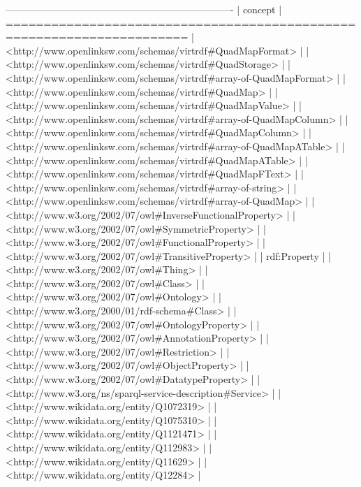 \documentclass[a4paper, 12pt]{report}
\begin{document}
\begin{messageshell}
----------------------------------------------------------------------
| concept                                                            |
======================================================================
| <http://www.openlinksw.com/schemas/virtrdf#QuadMapFormat>          |
| <http://www.openlinksw.com/schemas/virtrdf#QuadStorage>            |
| <http://www.openlinksw.com/schemas/virtrdf#array-of-QuadMapFormat> |
| <http://www.openlinksw.com/schemas/virtrdf#QuadMap>                |
| <http://www.openlinksw.com/schemas/virtrdf#QuadMapValue>           |
| <http://www.openlinksw.com/schemas/virtrdf#array-of-QuadMapColumn> |
| <http://www.openlinksw.com/schemas/virtrdf#QuadMapColumn>          |
| <http://www.openlinksw.com/schemas/virtrdf#array-of-QuadMapATable> |
| <http://www.openlinksw.com/schemas/virtrdf#QuadMapATable>          |
| <http://www.openlinksw.com/schemas/virtrdf#QuadMapFText>           |
| <http://www.openlinksw.com/schemas/virtrdf#array-of-string>        |
| <http://www.openlinksw.com/schemas/virtrdf#array-of-QuadMap>       |
| <http://www.w3.org/2002/07/owl#InverseFunctionalProperty>          |
| <http://www.w3.org/2002/07/owl#SymmetricProperty>                  |
| <http://www.w3.org/2002/07/owl#FunctionalProperty>                 |
| <http://www.w3.org/2002/07/owl#TransitiveProperty>                 |
| rdf:Property                                                       |
| <http://www.w3.org/2002/07/owl#Thing>                              |
| <http://www.w3.org/2002/07/owl#Class>                              |
| <http://www.w3.org/2002/07/owl#Ontology>                           |
| <http://www.w3.org/2000/01/rdf-schema#Class>                       |
| <http://www.w3.org/2002/07/owl#OntologyProperty>                   |
| <http://www.w3.org/2002/07/owl#AnnotationProperty>                 |
| <http://www.w3.org/2002/07/owl#Restriction>                        |
| <http://www.w3.org/2002/07/owl#ObjectProperty>                     |
| <http://www.w3.org/2002/07/owl#DatatypeProperty>                   |
| <http://www.w3.org/ns/sparql-service-description#Service>          |
| <http://www.wikidata.org/entity/Q1072319>                          |
| <http://www.wikidata.org/entity/Q1075310>                          |
| <http://www.wikidata.org/entity/Q1121471>                          |
| <http://www.wikidata.org/entity/Q112983>                           |
| <http://www.wikidata.org/entity/Q11629>                            |
| <http://www.wikidata.org/entity/Q12284>                            |

\end{messageshell}
\end{document}

